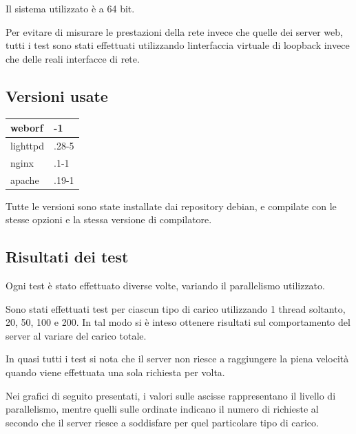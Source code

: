 \documentclass[a4paper,11pt]{article}
\begin{document}
{\sffamily
Il sistema utilizzato \`e a 64 bit.}

{\sffamily
Per evitare di misurare le prestazioni della rete invece che quelle dei
server web, tutti i test sono stati effettuati utilizzando
l{\textquotesingle}interfaccia virtuale di loopback invece che delle
reali interfacce di rete.}


\bigskip

\subsection{Versioni usate}
\begin{flushleft}
\tablehead{}
\begin{supertabular}{|m{4.2450004cm}|m{5.4620004cm}|}
\hline
\sffamily weborf &
-1\\\hline
\sffamily lighttpd &
.28-5\\\hline
\sffamily nginx &
.1-1\\\hline
\sffamily apache &
.19-1\\\hline
\end{supertabular}
\end{flushleft}
{\sffamily
Tutte le versioni sono state installate dai repository debian, e
compilate con le stesse opzioni e la stessa versione di compilatore.}


\bigskip

\subsection{Risultati dei test}
{\sffamily
Ogni test \`e stato effettuato diverse volte, variando il parallelismo
utilizzato.}

{\sffamily
Sono stati effettuati test per ciascun tipo di carico utilizzando 1
thread soltanto, 20, 50, 100 e 200. In tal modo si \`e inteso ottenere
risultati sul comportamento del server al variare del carico totale.}

{\sffamily
In quasi tutti i test si nota che il server non riesce a raggiungere la
piena velocit\`a quando viene effettuata una sola richiesta per volta.}


\bigskip

{\sffamily
Nei grafici di seguito presentati, i valori sulle ascisse rappresentano
il livello di parallelismo, mentre quelli sulle ordinate indicano il
numero di richieste al secondo che il server riesce a soddisfare per
quel particolare tipo di carico.}
\end{document}
